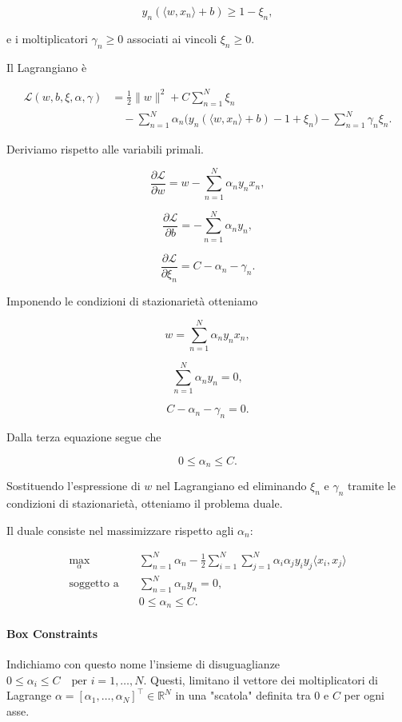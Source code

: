 \[
y_n(\langle w,x_n\rangle + b) \ge 1 - \xi_n,
\]

e i moltiplicatori $\gamma_n \ge 0$ associati ai vincoli
$\xi_n \ge 0$.

Il Lagrangiano è

\[
\begin{aligned}
\mathcal{L}(w,b,\xi,\alpha,\gamma)
&=
\frac{1}{2}\|w\|^2
+ C \sum_{n=1}^{N} \xi_n
\\
&\quad
- \sum_{n=1}^{N}
\alpha_n
\big(
y_n(\langle w,x_n\rangle + b) - 1 + \xi_n
\big)
- \sum_{n=1}^{N} \gamma_n \xi_n .
\end{aligned}
\]

Deriviamo rispetto alle variabili primali.

\[
\frac{\partial \mathcal{L}}{\partial w}
=
w - \sum_{n=1}^{N} \alpha_n y_n x_n,
\]

\[
\frac{\partial \mathcal{L}}{\partial b}
=
- \sum_{n=1}^{N} \alpha_n y_n,
\]

\[
\frac{\partial \mathcal{L}}{\partial \xi_n}
=
C - \alpha_n - \gamma_n.
\]

Imponendo le condizioni di stazionarietà otteniamo

\[
w = \sum_{n=1}^{N} \alpha_n y_n x_n,
\]

\[
\sum_{n=1}^{N} \alpha_n y_n = 0,
\]

\[
C - \alpha_n - \gamma_n = 0.
\]

Dalla terza equazione segue che

\[
0 \le \alpha_n \le C.
\]

Sostituendo l'espressione di $w$ nel Lagrangiano
ed eliminando $\xi_n$ e $\gamma_n$ tramite le condizioni
di stazionarietà, otteniamo il problema duale.

Il duale consiste nel massimizzare rispetto agli $\alpha_n$:

\[
\begin{aligned}
\max_{\alpha} \quad
& \sum_{n=1}^{N} \alpha_n
-
\frac{1}{2}
\sum_{i=1}^{N}\sum_{j=1}^{N}
\alpha_i \alpha_j y_i y_j
\langle x_i,x_j\rangle
\\
\text{soggetto a} \quad
& \sum_{n=1}^{N} \alpha_n y_n = 0, \\
& 0 \le \alpha_n \le C.
\end{aligned}
\]

\paragraph{Box Constraints} Indichiamo con questo nome l'insieme di disuguaglianze $0 \le \alpha_i \le C \quad\text{per } i=1,\dots,N$. Questi, limitano il vettore dei moltiplicatori di Lagrange $\alpha = [\alpha_1, \dots, \alpha_N]^\top\in \mathbb{R}^N$ in una "scatola" definita tra 0 e $C$ per ogni asse.

